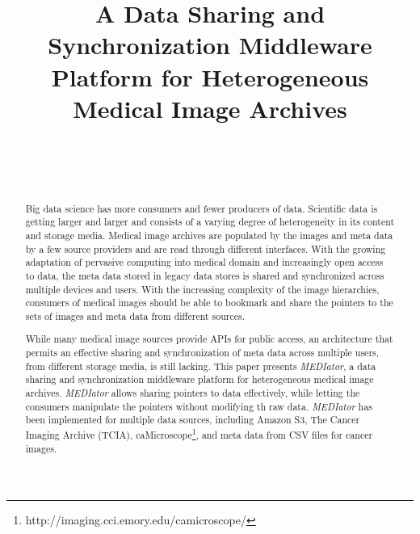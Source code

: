 \documentclass[conference]{IEEEtran}
\begin{document}
\title{A Data Sharing and Synchronization Middleware Platform for Heterogeneous Medical Image Archives\vspace{-33pt}}

\author{
\\[-5.0ex]
\and
{}
\\[-5.0ex]}
\maketitle

\begin{abstract}
Big data science has more consumers and fewer producers of data. Scientific data is getting larger and larger and consists of a varying degree of heterogeneity in its content and storage media. Medical image archives are populated by the images and meta data by a few source providers and are read through different interfaces. With the growing adaptation of pervasive computing into medical domain and increasingly open access to data, the meta data stored in legacy data stores is shared and synchronized across multiple devices and users. With the increasing complexity of the image hierarchies, consumers of medical images should be able to bookmark and share the pointers to the sets of images and meta data from different sources. 

While many medical image sources provide APIs for public access, an architecture that permits an effective sharing and synchronization of meta data across multiple users, from different storage media, is still lacking. This paper presents \textit{MEDIator}, a data sharing and synchronization middleware platform for heterogeneous medical image archives. \textit{MEDIator} allows sharing pointers to data effectively, while letting the consumers manipulate the pointers without modifying th raw data. \textit{MEDIator} has been implemented for multiple data sources, including Amazon S3, The Cancer Imaging Archive (TCIA), caMicroscope\footnote{http://imaging.cci.emory.edu/camicroscope/}, and meta data from CSV files for cancer images.
\end{abstract}
\end{document}
